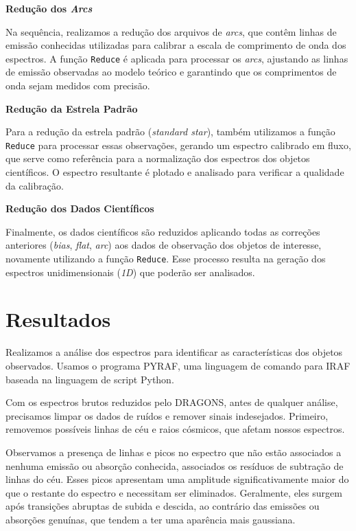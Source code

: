 \textbf{Redução dos \textit{Arcs}}

Na sequência, realizamos a redução dos arquivos de \textit{arcs}, que contêm linhas de emissão conhecidas utilizadas para calibrar a escala de comprimento de onda dos espectros. A função \verb|Reduce| é aplicada para processar os \textit{arcs}, ajustando as linhas de emissão observadas ao modelo teórico e garantindo que os comprimentos de onda sejam medidos com precisão.

\textbf{Redução da Estrela Padrão}

Para a redução da estrela padrão (\textit{standard star}), também utilizamos a função \verb|Reduce| para processar essas observações, gerando um espectro calibrado em fluxo, que serve como referência para a normalização dos espectros dos objetos científicos. O espectro resultante é plotado e analisado para verificar a qualidade da calibração.

\textbf{Redução dos Dados Científicos}

Finalmente, os dados científicos são reduzidos aplicando todas as correções anteriores (\textit{bias}, \textit{flat}, \textit{arc}) aos dados de observação dos objetos de interesse, novamente utilizando a função \verb|Reduce|. Esse processo resulta na geração dos espectros unidimensionais (\textit{1D}) que poderão ser analisados.

\section{Resultados}\label{sec:resultados}
Realizamos a análise dos espectros para identificar as características dos objetos observados. Usamos o programa PYRAF, uma linguagem de comando para IRAF baseada na linguagem de script Python.

Com os espectros brutos reduzidos pelo DRAGONS, antes de qualquer análise, precisamos limpar os dados de ruídos e remover sinais indesejados. Primeiro, removemos possíveis linhas de céu e raios cósmicos, que afetam nossos espectros. 

Observamos a presença de linhas e picos no espectro que não estão associados a nenhuma emissão ou absorção conhecida, associados os resíduos de subtração de linhas do céu. Esses picos apresentam uma amplitude significativamente maior do que o restante do espectro e necessitam ser eliminados. Geralmente, eles surgem após transições abruptas de subida e descida, ao contrário das emissões ou absorções genuínas, que tendem a ter uma aparência mais gaussiana.

